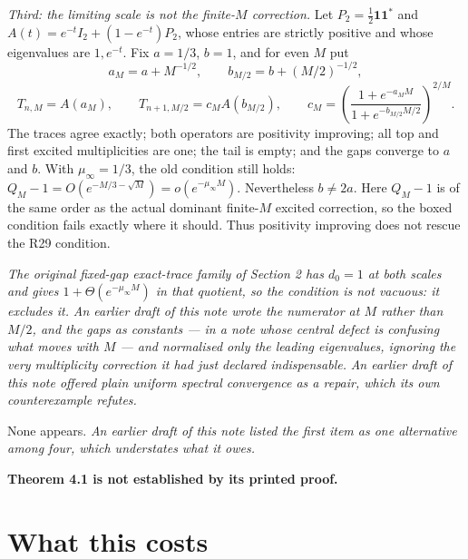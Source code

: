 \documentclass[11pt]{article}
\begin{document}
\begin{itemize}
\emph{Third: the limiting scale is not the finite-$M$ correction.}  Let
$P_2=\tfrac12\mathbf1\mathbf1^*$ and
$A(t)=e^{-t}I_2+(1-e^{-t})P_2$, whose entries are strictly positive and whose
eigenvalues are $1,e^{-t}$.  Fix $a=1/3$, $b=1$, and for even $M$ put
\[
 a_M=a+M^{-1/2},\qquad b_{M/2}=b+(M/2)^{-1/2},
\]
\[
 T_{n,M}=A(a_M),\qquad T_{n+1,M/2}=c_M A(b_{M/2}),\qquad
 c_M=\left(\frac{1+e^{-a_MM}}{1+e^{-b_{M/2}M/2}}\right)^{2/M}.
\]
The traces agree exactly; both operators are positivity improving; all top and first
excited multiplicities are one; the tail is empty; and the gaps converge to $a$ and
$b$.  With $\mu_\infty=1/3$, the old condition still holds:
$Q_M-1=O(e^{-M/3-\sqrt M})=o(e^{-\mu_\infty M})$.  Nevertheless
$b\ne2a$.  Here $Q_M-1$ is of the same order as the actual dominant finite-$M$
excited correction, so the boxed condition fails exactly where it should.  Thus
positivity improving does not rescue the R29 condition.

\emph{The original fixed-gap exact-trace family of Section 2 has $d_0=1$ at both scales and gives
$1+\Theta(e^{-\mu_\infty M})$ in that quotient, so the condition is not vacuous: it
excludes it.} \emph{An earlier draft of this note wrote the numerator at $M$ rather than
$M/2$, and the gaps as constants --- in a note whose central defect is confusing what
moves with $M$ --- and normalised only the leading eigenvalues, ignoring the very
multiplicity correction it had just declared indispensable.} \emph{An earlier draft of this note offered plain uniform
spectral convergence as a repair, which its own counterexample refutes.}
\end{itemize}
None appears. \emph{An earlier draft of this note listed the first item as one
alternative among four, which understates what it owes.}

\textbf{Theorem 4.1 is not established by its printed proof.}

\section{What this costs}
\end{document}

